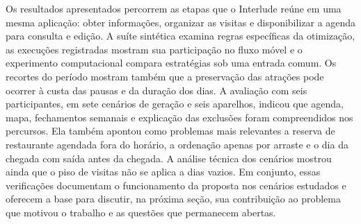 Os resultados apresentados percorrem as etapas que o Interlude reúne em uma mesma aplicação: obter informações, organizar as visitas e disponibilizar a agenda para consulta e edição. A suíte sintética examina regras específicas da otimização, as execuções registradas mostram sua participação no fluxo móvel e o experimento computacional compara estratégias sob uma entrada comum. Os recortes do período mostram também que a preservação das atrações pode ocorrer à custa das pausas e da duração dos dias. A avaliação com seis participantes, em sete cenários de geração e seis aparelhos, indicou que agenda, mapa, fechamentos semanais e explicação das exclusões foram compreendidos nos percursos. Ela também apontou como problemas mais relevantes a reserva de restaurante agendada fora do horário, a ordenação apenas por arraste e o dia da chegada com saída antes da chegada. A análise técnica dos cenários mostrou ainda que o piso de visitas não se aplica a dias vazios. Em conjunto, essas verificações documentam o funcionamento da proposta nos cenários estudados e oferecem a base para discutir, na próxima seção, sua contribuição ao problema que motivou o trabalho e as questões que permanecem abertas.
